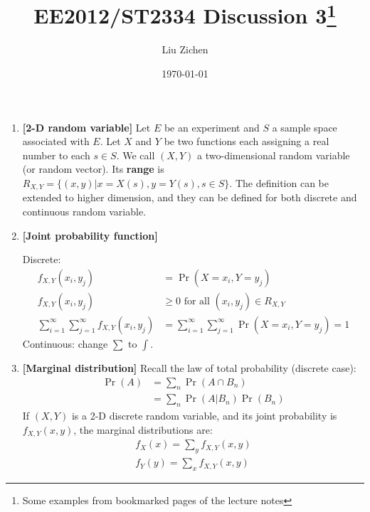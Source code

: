 \documentclass[a4paper]{article}
\title{EE2012/ST2334 Discussion 3\footnote{Some examples from bookmarked pages of the lecture notes}}
\author{Liu Zichen}
\date{\today}
\begin{document}
\maketitle

\begin{enumerate}

\item
\textbf{[2-D random variable]}
Let $E$ be an experiment and $S$ a sample space associated with $E$. Let $X$ and $Y$ be two functions each assigning a real number to each $s \in S$. We call $(X, Y)$ a two-dimensional random variable (or random vector). Its \textbf{range} is $R_{X, Y}=\{(x, y) | x=X(s), y=Y(s), s \in S\}$. The definition can be extended to higher dimension, and they can be defined for both discrete and continuous random variable.

\item
\textbf{[Joint probability function]}

Discrete:
\begin{equation}
\begin{split}
    f_{X, Y}\left(x_{i}, y_{j}\right) & = 
    \operatorname{Pr}\left(X=x_{i}, Y=y_{j}\right) \\
    f_{X, Y}\left(x_{i}, y_{j}\right) & \geq 0 \text{ for all } (x_i, y_j) \in R_{X, Y}\\
    \sum_{i=1}^{\infty} \sum_{j=1}^{\infty} f_{X, Y}\left(x_{i}, y_{j}\right)& =\sum_{i=1}^{\infty} \sum_{j=1}^{\infty} \operatorname{Pr}\left(X=x_{i}, Y=y_{j}\right)=1
\end{split}
\end{equation}
Continuous: change $\sum$ to $\int$.

\item
\textbf{[Marginal distribution]}
Recall the law of total probability (discrete case):
\begin{equation}
    \begin{split}
        \operatorname{Pr}(A)
        &=\sum_{n} \operatorname{Pr}\left(A \cap B_{n}\right) \\
        &=\sum_{n} \operatorname{Pr}(A | B_{n}) \operatorname{Pr}\left(B_{n}\right)
    \end{split}
\end{equation}
If $(X, Y)$ is a 2-D discrete random variable, and its joint probability is $f_{X, Y}(x, y)$, the marginal distributions are:
\begin{equation}
    \begin{split}
        f_{X}(x)=\sum_{y} f_{X, Y}(x, y) \\
        f_{Y}(y)=\sum_{x} f_{X, Y}(x, y)
    \end{split}
\end{equation}


\end{enumerate}
\end{document}
